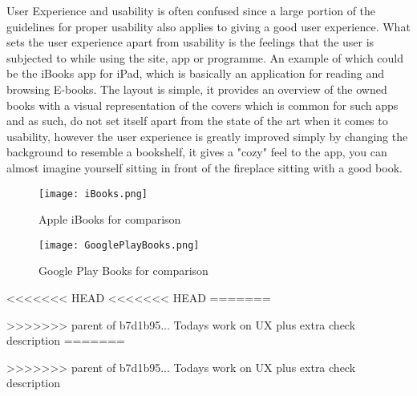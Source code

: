 User Experience and usability is often confused since a large portion of the guidelines for proper usability also applies to giving a good user experience. What sets the user experience apart from usability is the feelings that the user is subjected to while using the site, app or programme.
An example of which could be the iBooks app for iPad, which is basically an application for reading and browsing E-books. The layout is simple,  it provides an overview of the owned books with a visual representation of the covers which is common for such apps and as such, do not set itself apart from the state of the art when it comes to usability, however the user experience is greatly improved simply by changing the background to resemble a bookshelf, it gives a "cozy" feel to the app, you can almost imagine yourself sitting in front of the fireplace sitting with a good book.
\begin{figure}[H]
\centering
\texttt{[image: iBooks.png]}
\caption{Apple iBooks for comparison}
\end{figure}

\begin{figure}[H]
\centering
\texttt{[image: GooglePlayBooks.png]}
\caption{Google Play Books for comparison}
\end{figure}
<<<<<<< HEAD
<<<<<<< HEAD
=======


>>>>>>> parent of b7d1b95... Todays work on UX plus extra check description
=======


>>>>>>> parent of b7d1b95... Todays work on UX plus extra check description
